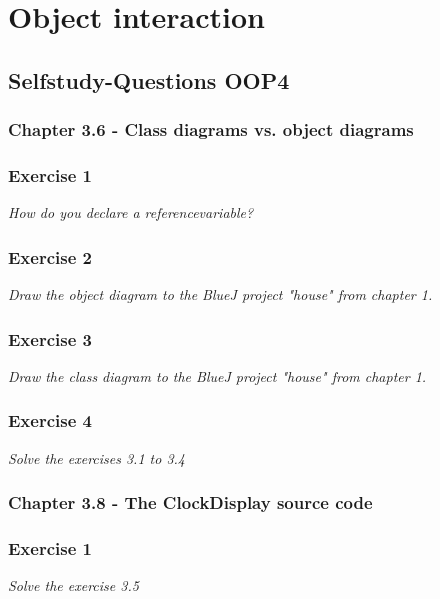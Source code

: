 \section{Object interaction}

\subsection{Selfstudy-Questions OOP4}

\subsubsection{Chapter 3.6 - Class diagrams vs. object diagrams}

\subsubsection*{Exercise 1}
\textit{How do you declare a referencevariable?}\\


\subsubsection*{Exercise 2}
\textit{Draw the object diagram to the BlueJ project "house" from 
chapter 1.}\\


\subsubsection*{Exercise 3}
\textit{Draw the class diagram to the BlueJ project "house" from
chapter 1.}\\


\subsubsection*{Exercise 4}
\textit{Solve the exercises 3.1 to 3.4}\\

\subsubsection{Chapter 3.8 - The ClockDisplay source code}

\subsubsection*{Exercise 1}
\textit{Solve the exercise 3.5}\\


